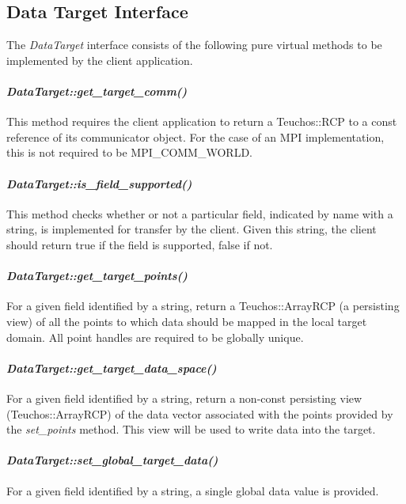 \documentclass[letterpaper]{article}
\begin{document}
\subsection{Data Target Interface}
The {\sl DataTarget} interface consists of the following pure
virtual methods to be implemented by the client application.

\paragraph{\sl DataTarget::get\_target\_comm()}
This method requires the client application to return a Teuchos::RCP
to a const reference of its communicator object. For the case of an
MPI implementation, this is not required to be MPI\_COMM\_WORLD.

\paragraph{\sl DataTarget::is\_field\_supported()}
This method checks whether or not a particular field, indicated by
name with a string, is implemented for transfer by the client. Given
this string, the client should return true if the field is supported,
false if not.

\paragraph{\sl DataTarget::get\_target\_points()}
For a given field identified by a string, return a Teuchos::ArrayRCP
(a persisting view) of all the points to which data should be mapped
in the local target domain. All point handles are required to be
globally unique.

\paragraph{\sl DataTarget::get\_target\_data\_space()}
For a given field identified by a string, return a non-const
persisting view (Teuchos::ArrayRCP) of the data vector associated with
the points provided by the {\sl set\_points} method. This view will be
used to write data into the target.

\paragraph{\sl DataTarget::set\_global\_target\_data()}
For a given field identified by a string, a single global data value
is provided.
\end{document}
